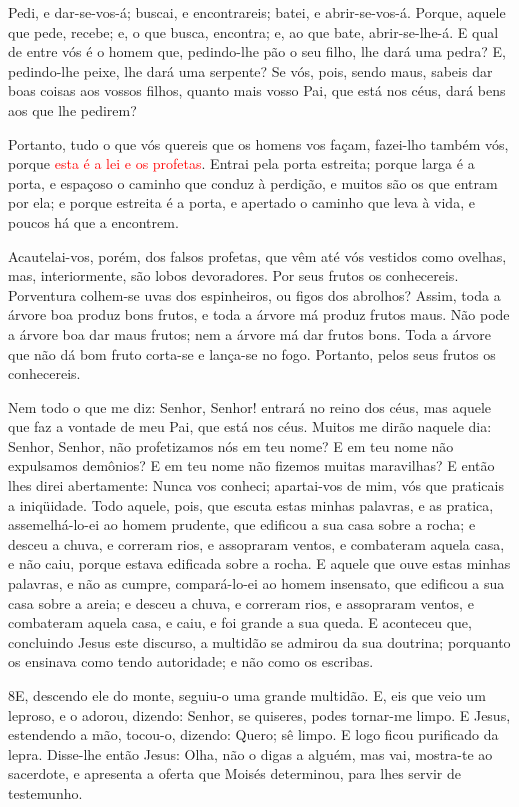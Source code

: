 Pedi, e dar-se-vos-á; buscai, e encontrareis; batei, e
abrir-se-vos-á. Porque, aquele que pede, recebe; e, o que busca,
encontra; e, ao que bate, abrir-se-lhe-á. E qual de entre vós é
o homem que, pedindo-lhe pão o seu filho, lhe dará uma pedra?
E, pedindo-lhe peixe, lhe dará uma serpente? Se vós,
pois, sendo maus, sabeis dar boas coisas aos vossos filhos, quanto
mais vosso Pai, que está nos céus, dará bens aos que lhe pedirem?

Portanto, tudo o que vós quereis que os homens vos façam,
fazei-lho também vós, porque \textcolor{red}{esta é a lei e os profetas}.
Entrai pela porta estreita; porque larga é a porta, e
espaçoso o caminho que conduz à perdição, e muitos são os que entram
por ela; e porque estreita é a porta, e apertado o caminho
que leva à vida, e poucos há que a encontrem.

A\-cau\-te\-lai-vos, porém, dos falsos profetas, que vêm até vós
vestidos como ovelhas, mas, interiormente, são lobos devoradores.
Por seus frutos os conhecereis. Porventura colhem-se uvas dos
espinheiros, ou figos dos abrolhos? Assim, toda a árvore boa
produz bons frutos, e toda a árvore má produz frutos maus.
Não pode a árvore boa dar maus frutos; nem a árvore má dar
frutos bons. Toda a árvore que não dá bom fruto corta-se e
lança-se no fogo. Portanto, pelos seus frutos os conhecereis.

Nem todo o que me diz: Senhor, Senhor! entrará no reino dos céus,
mas aquele que faz a vontade de meu Pai, que está nos céus.
Muitos me dirão naquele dia: Senhor, Senhor, não profetizamos
nós em teu nome? E em teu nome não expulsamos demônios? E em teu
nome não fizemos muitas maravilhas? E então lhes direi
abertamente: Nunca vos conheci; apartai-vos de mim, vós que
praticais a iniqüidade. Todo aquele, pois, que escuta estas
minhas palavras, e as pratica, assemelhá-lo-ei ao homem prudente,
que edificou a sua casa sobre a rocha; e desceu a chuva, e
correram rios, e assopraram ventos, e combateram aquela casa, e não
caiu, porque estava edificada sobre a rocha. E aquele que
ouve estas minhas palavras, e não as cumpre, compará-lo-ei ao homem
insensato, que edificou a sua casa sobre a areia; e desceu a
chuva, e correram rios, e assopraram ventos, e combateram aquela
casa, e caiu, e foi grande a sua queda. E aconteceu que,
concluindo Jesus este discurso, a multidão se admirou da sua
doutrina; porquanto os ensinava como tendo autoridade; e não
como os escribas.

\medskip

\lettrine{8} E, descendo ele do monte, seguiu-o uma grande
multidão. E, eis que veio um leproso, e o adorou, dizendo:
Senhor, se quiseres, podes tornar-me limpo. E Jesus, estendendo
a mão, tocou-o, dizendo: Quero; sê limpo. E logo ficou purificado da
lepra. Disse-lhe então Jesus: Olha, não o digas a alguém, mas
vai, mostra-te ao sacerdote, e apresenta a oferta que Moisés
determinou, para lhes servir de testemunho.

